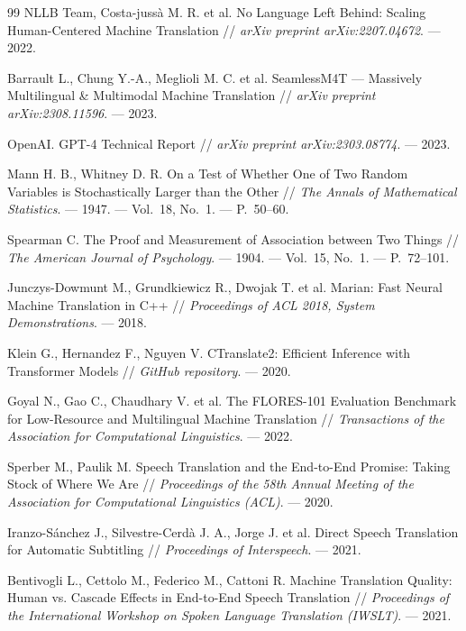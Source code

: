 \begin{thebibliography}{99}
NLLB Team, Costa-jussà M. R. et al.
No Language Left Behind: Scaling Human-Centered Machine Translation //
\textit{arXiv preprint arXiv:2207.04672}. --- 2022.

Barrault L., Chung Y.-A., Meglioli M. C. et al.
SeamlessM4T --- Massively Multilingual \& Multimodal Machine Translation //
\textit{arXiv preprint arXiv:2308.11596}. --- 2023.

OpenAI.
GPT-4 Technical Report //
\textit{arXiv preprint arXiv:2303.08774}. --- 2023.

Mann H. B., Whitney D. R.
On a Test of Whether One of Two Random Variables is Stochastically Larger
than the Other //
\textit{The Annals of Mathematical Statistics}. --- 1947. --- Vol.~18, No.~1.
--- P.~50--60.

Spearman C.
The Proof and Measurement of Association between Two Things //
\textit{The American Journal of Psychology}. --- 1904. --- Vol.~15, No.~1.
--- P.~72--101.

Junczys-Dowmunt M., Grundkiewicz R., Dwojak T. et al.
Marian: Fast Neural Machine Translation in C++ //
\textit{Proceedings of ACL 2018, System Demonstrations}. --- 2018.

Klein G., Hernandez F., Nguyen V.
CTranslate2: Efficient Inference with Transformer Models //
\textit{GitHub repository}. --- 2020.

Goyal N., Gao C., Chaudhary V. et al.
The FLORES-101 Evaluation Benchmark for Low-Resource and Multilingual
Machine Translation //
\textit{Transactions of the Association for Computational Linguistics}. --- 2022.

Sperber M., Paulik M.
Speech Translation and the End-to-End Promise: Taking Stock of Where
We Are //
\textit{Proceedings of the 58th Annual Meeting of the Association for
Computational Linguistics (ACL)}. --- 2020.

Iranzo-Sánchez J., Silvestre-Cerdà J. A., Jorge J. et al.
Direct Speech Translation for Automatic Subtitling //
\textit{Proceedings of Interspeech}. --- 2021.

Bentivogli L., Cettolo M., Federico M., Cattoni R.
Machine Translation Quality: Human vs. Cascade Effects in End-to-End
Speech Translation //
\textit{Proceedings of the International Workshop on Spoken Language
Translation (IWSLT)}. --- 2021.


\end{thebibliography}
